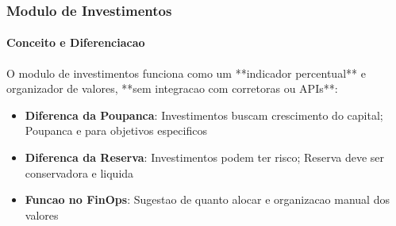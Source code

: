 \subsubsection{Modulo de Investimentos}

\paragraph{Conceito e Diferenciacao}
O modulo de investimentos funciona como um **indicador percentual** e organizador de valores, **sem integracao com corretoras ou APIs**:

\begin{itemize}
    \item \textbf{Diferenca da Poupanca}: Investimentos buscam crescimento do capital; Poupanca e para objetivos especificos
    \item \textbf{Diferenca da Reserva}: Investimentos podem ter risco; Reserva deve ser conservadora e liquida
    \item \textbf{Funcao no FinOps}: Sugestao de quanto alocar e organizacao manual dos valores
\end{itemize}

